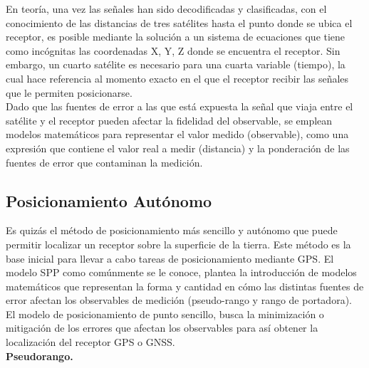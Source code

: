 En teoría, una vez las señales han sido decodificadas y clasificadas, con el conocimiento de las distancias de tres satélites hasta el punto donde se ubica el receptor, es posible mediante la solución a un sistema de ecuaciones que tiene como incógnitas las coordenadas X, Y, Z donde se encuentra el receptor. Sin embargo, un cuarto satélite es necesario para una cuarta variable (tiempo), la cual hace referencia al momento exacto en el que el receptor recibir las señales que le permiten posicionarse.\\

Dado que las fuentes de error a las que está expuesta la señal que viaja entre el satélite y el receptor pueden afectar la fidelidad del observable, se emplean modelos matemáticos para representar el valor medido (observable), como una expresión que contiene el valor real a medir (distancia) y la ponderación de las fuentes de error que contaminan la medición.

\subsection{Posicionamiento Autónomo %
}

Es quizás el método de posicionamiento más sencillo y autónomo que puede permitir localizar un receptor sobre la superficie de la tierra. Este método es la base inicial para llevar a cabo tareas de posicionamiento mediante GPS. El modelo SPP como comúnmente se le conoce, plantea la introducción de modelos matemáticos que representan la forma y cantidad en cómo las distintas fuentes de error afectan los observables de medición (pseudo-rango y rango de portadora).\\

El modelo de posicionamiento de punto sencillo, busca la minimización o mitigación de los errores que afectan los observables para así obtener la localización del receptor GPS o GNSS. \\%

\textbf{Pseudorango.}\\

